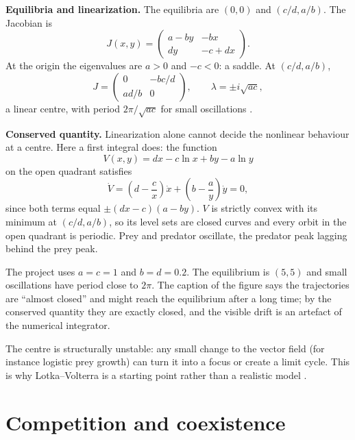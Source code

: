 \textbf{Equilibria and linearization.}
The equilibria are $(0,0)$ and
$(c/d, a/b)$. The Jacobian is
$$
J(x,y) =
\begin{pmatrix}
a-by & -bx \\
dy & -c+dx
\end{pmatrix}.
$$
At the origin the eigenvalues are $a>0$
and $-c<0$: a saddle. At $(c/d,a/b)$,
$$
J =
\begin{pmatrix}
0 & -bc/d \\
ad/b & 0
\end{pmatrix},
\qquad
\lambda = \pm i\sqrt{ac},
$$
a linear centre, with period
$2\pi/\sqrt{ac}$ for small oscillations
\cite[Section 3.1]{murray2002mathematical}.

\textbf{Conserved quantity.}
Linearization alone cannot decide the
nonlinear behaviour at a centre. Here a
first integral does: the function
$$
V(x,y) = dx - c\ln x + by - a\ln y
$$
on the open quadrant satisfies
$$
\dot V
= \left(d-\frac{c}{x}\right)\dot x
+ \left(b-\frac{a}{y}\right)\dot y
= 0 ,
$$
since both terms equal
$\pm(dx-c)(a-by)$. $V$ is strictly convex
with its minimum at $(c/d,a/b)$, so its
level sets are closed curves and every
orbit in the open quadrant is periodic.
Prey and predator oscillate, the predator
peak lagging behind the prey peak.

\begin{example}
\label{example-lv-paper}
The project uses $a=c=1$ and $b=d=0.2$.
The equilibrium is $(5,5)$ and small
oscillations have period close to $2\pi$.
The caption of the figure says the
trajectories are ``almost closed'' and
might reach the equilibrium after a long
time; by the conserved quantity they are
exactly closed, and the visible drift is
an artefact of the numerical integrator.
\end{example}

\begin{remark}
\label{remark-lv-structural}
The centre is structurally unstable: any
small change to the vector field (for
instance logistic prey growth) can turn it
into a focus or create a limit cycle. This
is why Lotka--Volterra is a starting point
rather than a realistic model
\cite[Section 3.1]{murray2002mathematical}.
\end{remark}

\section{Competition and coexistence}
\label{section-competition}

